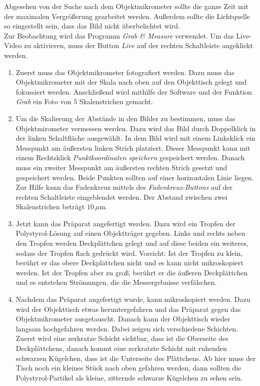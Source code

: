 Abgesehen von der Suche nach dem Objektmikrometer sollte die ganze Zeit mit der maximalen Vergrößerung gearbeitet werden. Außerdem sollte die Lichtquelle so eingestellt sein, dass das Bild nicht überbelichtet wird. \\
Zur Beobachtung wird das Programm \emph{Grab \& Measure} verwendet. Um das Live-Video zu aktivieren, muss der Button \emph{Live} auf der rechten Schaltleiste angeklickt werden.

\begin{enumerate}

  \item Zuerst muss das Objektmikrometer fotografiert werden. Dazu muss das Objektmikrometer mit der Skala nach oben auf den Objekttisch gelegt und fokussiert werden. Anschließend wird mithilfe der Software und der Funktion \emph{Grab} ein Foto von $5$ Skalenstrichen gemacht.

  \item Um die Skalierung der Abstände in den Bilder zu bestimmen, muss das Objektmirometer vermessen werden. Dazu wird das Bild durch Doppelklick in der linken Schaltfläche ausgewählt. In dem Bild wird mit einem Linksklick ein Messpunkt am äußersten linken Strich platziert. Dieser Messpunkt kann mit einem Rechtsklick \emph{Punktkoordinaten speichern} gespeichert werden. Danach muss ein zweiter Messpunkt am äußersten rechten Strich gesetzt und gespeichert werden. Beide Punkten sollten auf einer horizontalen Linie liegen. Zur Hilfe kann das Fadenkreuz mittels des \emph{Fadenkreuz-Buttons} auf der rechten Schaltleiste eingeblendet werden. Der Abstand zwischen zwei Skalenstrichen beträgt $10 \, \mu$m.


  \item Jetzt kann das Präparat angefertigt werden. Dazu wird ein Tropfen der Polystyrol-Lösung auf einen Objektträger gegeben. Links und rechts neben den Tropfen werden Deckplättchen gelegt und auf diese beiden ein weiteres, sodass der Tropfen flach gedrückt wird. Vorsicht: Ist der Tropfen zu klein, berührt er das obere Deckplättchen nicht und es kann nicht mikroskopiert werden. Ist der Tropfen aber zu groß, berührt er die äußeren Deckplättchen und es entstehen Strömungen, die die Messergebnisse verfälschen.

  \item Nachdem das Präparat angefertigt wurde, kann mikroskopiert werden. Dazu wird der Objekttisch etwas heruntergefahren und das Präparat gegen das Objektmikrometer ausgetauscht. Danach kann der Objekttisch wieder langsam hochgefahren werden. Dabei zeigen sich verschiedene Schichten. Zuerst wird eine zerkratze Schicht sichtbar, dass ist die Oberseite des Deckplättchens, danach kommt eine zerkratzte Schicht mit ruhenden schwarzen Kügelchen, dass ist die Unterseite des Plättchens. Ab hier muss der Tisch noch ein kleines Stück nach oben gefahren werden, dann sollten die Polystyrol-Partikel als kleine, zitternde schwarze Kügelchen zu sehen sein.


\end{enumerate}
